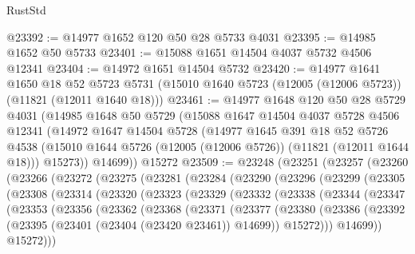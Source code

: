 \begin{lexlean}{RustStd}
\begin{coremodule}
@23392 := @14977 @1652 @120 @50 @28 @5733 @4031
@23395 := @14985 @1652 @50 @5733
@23401 := @15088 @1651 @14504 @4037 @5732 @4506 @12341
@23404 := @14972 @1651 @14504 @5732
@23420 := @14977
    @1641
    @1650
    @18
    @52
    @5723
    @5731
    (@15010 @1640 @5723 (@12005 (@12006 @5723)) (@11821 (@12011 @1640 @18)))
@23461 := @14977
    @1648
    @120
    @50
    @28
    @5729
    @4031
    (@14985
      @1648
      @50
      @5729
      (@15088
        @1647
        @14504
        @4037
        @5728
        @4506
        @12341
        (@14972
          @1647
          @14504
          @5728
          (@14977
            @1645
            @391
            @18
            @52
            @5726
            @4538
            (@15010 @1644 @5726 (@12005 (@12006 @5726)) (@11821 (@12011 @1644 @18)))
            @15273))
        @14699))
    @15272
@23509 := @23248
    (@23251
      (@23257
        (@23260
          (@23266
            (@23272
              (@23275
                (@23281
                  (@23284
                    (@23290
                      (@23296
                        (@23299
                          (@23305
                            (@23308
                              (@23314
                                (@23320
                                  (@23323
                                    (@23329
                                      (@23332
                                        (@23338
                                          (@23344
                                            (@23347
                                              (@23353
                                                (@23356
                                                  (@23362
                                                    (@23368
                                                      (@23371
                                                        (@23377
                                                          (@23380
                                                            (@23386
                                                              (@23392
                                                                (@23395
                                                                  (@23401
                                                                    (@23404 (@23420 @23461))
                                                                    @14699))
                                                                @15272)))
                                                          @14699))
                                                      @15272)))

\end{coremodule}
\end{lexlean}

